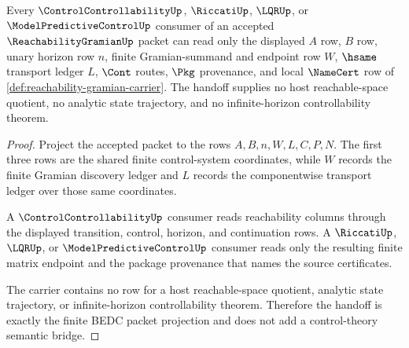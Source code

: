 \begin{theorem}
\label{thm:reachability-gramian-controllability-handoff}
Every $\ControlControllabilityUp$, $\RiccatiUp$, $\LQRUp$, or $\ModelPredictiveControlUp$ consumer of an accepted $\ReachabilityGramianUp$ packet can read only the displayed $A$ row, $B$ row, unary horizon row $n$, finite Gramian-summand and endpoint row $W$, $\hsame$ transport ledger $L$, $\Cont$ routes, $\Pkg$ provenance, and local $\NameCert$ row of \autoref{def:reachability-gramian-carrier}. The handoff supplies no host reachable-space quotient, no analytic state trajectory, and no infinite-horizon controllability theorem.
\end{theorem}
\begin{proof}
Project the accepted packet to the rows $A,B,n,W,L,C,P,N$. The first three rows are the shared finite control-system coordinates, while $W$ records the finite Gramian discovery ledger and $L$ records the componentwise transport ledger over those same coordinates.

A $\ControlControllabilityUp$ consumer reads reachability columns through the displayed transition, control, horizon, and continuation rows. A $\RiccatiUp$, $\LQRUp$, or $\ModelPredictiveControlUp$ consumer reads only the resulting finite matrix endpoint and the package provenance that names the source certificates.

The carrier contains no row for a host reachable-space quotient, analytic state trajectory, or infinite-horizon controllability theorem. Therefore the handoff is exactly the finite BEDC packet projection and does not add a control-theory semantic bridge.
\end{proof}

